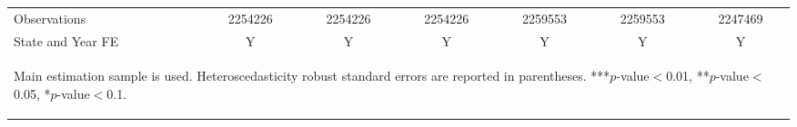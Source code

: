 \documentclass[10pt,letterpaper,subeqn]{beamer}
\begin{document}
\begin{frame}
\begin{table}[htbp]
{\begin{tabular}{l*{6}{c}}
\midrule
Observations        &     2254226   &     2254226   &     2254226   &     2259553   &     2259553   &     2247469   \\
State and Year FE   &     Y   &     Y   &     Y   &     Y   &     Y   &    Y   \\
\bottomrule
\multicolumn{7}{p{15cm}}{\begin{footnotesize}Main estimation
sample is used. Heteroscedasticity robust standard errors are reported in               parentheses.
***$p$-value$<$0.01, **$p$-value$<$0.05, *$p$-value$<$0.1.
\end{footnotesize}}\end{tabular}}
\end{table}
\end{frame}

\end{document}
